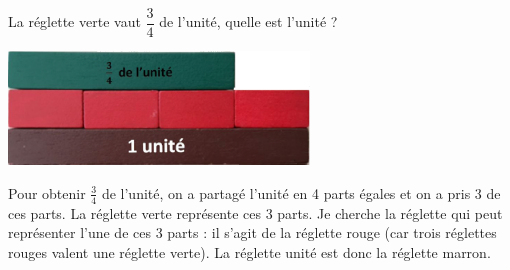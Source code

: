 \begin{exercice*}
   \medskip
   
   La réglette verte vaut $\dfrac34$  de l’unité, quelle est l’unité ? \\ [2mm]
   \begin{minipage}{8cm}
      \includegraphics[width=8cm]{Nombres_et_calculs_did/Images/Num4_activites_Cuisenaire_A5}
   \end{minipage}
   \qquad
   \begin{minipage}{8cm}
      Pour obtenir $\frac34$ de l’unité, on a partagé l’unité en 4 parts égales et on a pris 3 de ces parts. La réglette verte représente ces 3 parts. Je cherche la réglette qui peut représenter l’une de ces 3 parts : il s’agit de la réglette rouge (car trois réglettes rouges valent une réglette verte). La réglette unité est donc la réglette marron.
   \end{minipage}
\end{exercice*}


\pagebreak

